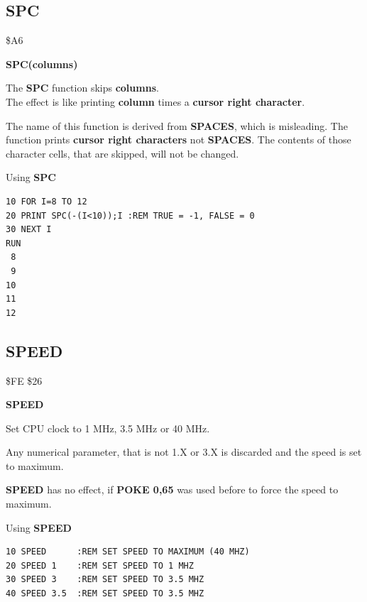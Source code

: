 
\newpage
\subsection{SPC}
\begin{description}[leftmargin=2cm,style=nextline]
\item [Token:] \$A6
\item [Format:] {\bf SPC(columns)}
\item [Usage:] The {\bf SPC} function skips {\bf columns}. \\
               The effect is like printing {\bf column}
               times a {\bf cursor right character}.

\item [Remarks:] The name of this function is derived from
                 {\bf SPACES}, which is misleading.
                 The function prints {\bf cursor right characters}
                 not {\bf SPACES}. The contents of those character
                 cells, that are skipped, will not be changed.

\item [Example:] Using {\bf SPC}
\begin{tcolorbox}[colback=black,coltext=white]
\verbatimfont{\codefont}
\begin{verbatim}
10 FOR I=8 TO 12
20 PRINT SPC(-(I<10));I :REM TRUE = -1, FALSE = 0
30 NEXT I
RUN
 8
 9
10
11
12
\end{verbatim}
\end{tcolorbox}
\end{description}


\newpage
\subsection{SPEED}
\begin{description}[leftmargin=2cm,style=nextline]
\item [Token:] \$FE \$26
\item [Format:] {\bf SPEED}
\item [Usage:] Set CPU clock to 1 MHz, 3.5 MHz or 40 MHz.
\item [Remarks:] Any numerical parameter, that is not 1.X or 3.X
                 is discarded and the speed is set to maximum.

                 {\bf SPEED} has no effect, if {\bf POKE 0,65}
                 was used before to force the speed to maximum.

\item [Example:] Using {\bf SPEED}
\begin{tcolorbox}[colback=black,coltext=white]
\verbatimfont{\codefont}
\begin{verbatim}
10 SPEED      :REM SET SPEED TO MAXIMUM (40 MHZ)
20 SPEED 1    :REM SET SPEED TO 1 MHZ
30 SPEED 3    :REM SET SPEED TO 3.5 MHZ
40 SPEED 3.5  :REM SET SPEED TO 3.5 MHZ
\end{verbatim}
\end{tcolorbox}
\end{description}

